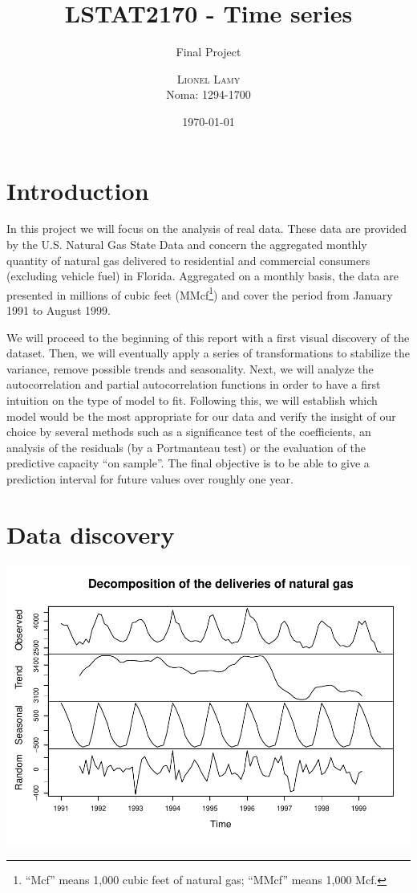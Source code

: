 \documentclass[a4paper, 12pt]{article}
\title{LSTAT2170 - Time series}
\subtitle{Final Project}
\author{\textsc{Lionel Lamy}   \\ Noma:  1294-1700  }
\institute{Université catholique de Louvain}
\date{\today}
\begin{document}
    \maketitle
        {
     \setcounter{tocdepth}{3}
     \romantableofcontents
    }
        
    

    \hypertarget{introduction}{%
    \section{Introduction}\label{introduction}}
    
    In this project we will focus on the analysis of real data. These data
    are provided by the U.S. Natural Gas State Data and concern the
    aggregated monthly quantity of natural gas delivered to residential and
    commercial consumers (excluding vehicle fuel) in Florida. Aggregated on
    a monthly basis, the data are presented in millions of cubic feet
    (MMcf\footnote{\quad``Mcf'' means 1,000 cubic feet of natural gas;
      ``MMcf'' means 1,000 Mcf.}) and cover the period from January 1991 to
    August 1999.
    
    We will proceed to the beginning of this report with a first visual
    discovery of the dataset. Then, we will eventually apply a series of
    transformations to stabilize the variance, remove possible trends and
    seasonality. Next, we will analyze the autocorrelation and partial
    autocorrelation functions in order to have a first intuition on the type
    of model to fit. Following this, we will establish which model would be
    the most appropriate for our data and verify the insight of our choice
    by several methods such as a significance test of the coefficients, an
    analysis of the residuals (by a Portmanteau test) or the evaluation of
    the predictive capacity ``on sample''. The final objective is to be able
    to give a prediction interval for future values over roughly one year.
    
    \hypertarget{data-discovery}{%
    \section{Data discovery}\label{data-discovery}}
    
    \begin{center}\includegraphics[width=0.8\linewidth]{resources/figs/unnamed-chunk-1-1} \end{center}
    
\end{document}
